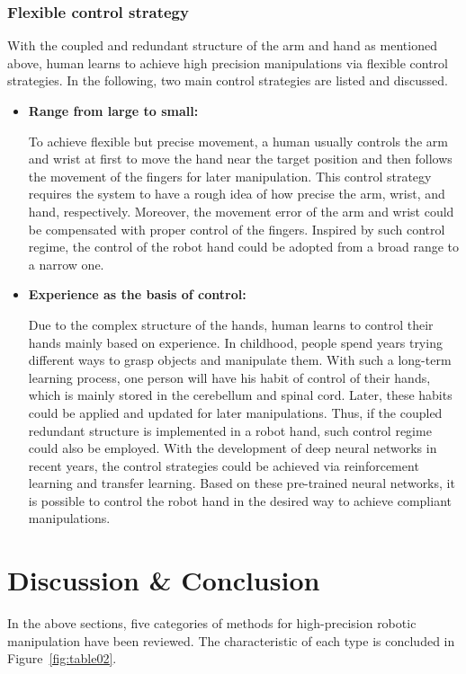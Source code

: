 \documentclass[journal,twoside,web]{ieeecolor}
\begin{document}
\subsubsection{Flexible control strategy} 
With the coupled and redundant structure of the arm and hand as mentioned above, human learns to achieve high precision manipulations via flexible control strategies. In the following, two main control strategies are listed and discussed.
\begin{itemize}
    \item \textbf{Range from large to small:}
    
    To achieve flexible but precise movement, a human usually controls the arm and wrist at first to move the hand near the target position and then follows the movement of the fingers for later manipulation. This control strategy requires the system to have a rough idea of how precise the arm, wrist, and hand, respectively. Moreover, the movement error of the arm and wrist could be compensated with proper control of the fingers. Inspired by such control regime, the control of the robot hand could be adopted from a broad range to a narrow one.
    
    \item \textbf{Experience as the basis of control:}
    
    Due to the complex structure of the hands, human learns to control their hands mainly based on experience. In childhood, people spend years trying different ways to grasp objects and manipulate them. With such a long-term learning process, one person will have his habit of control of their hands, which is mainly stored in the cerebellum and spinal cord. Later, these habits could be applied and updated for later manipulations. Thus, if the coupled redundant structure is implemented in a robot hand, such control regime could also be employed. With the development of deep neural networks in recent years, the control strategies could be achieved via reinforcement learning and transfer learning. Based on these pre-trained neural networks, it is possible to control the robot hand in the desired way to achieve compliant manipulations.	
\end{itemize}

\section{Discussion \& Conclusion}
\label{sec:discuss}

In the above sections, five categories of methods for high-precision robotic manipulation have been reviewed. 
The characteristic of each type is concluded in Figure~\ref{fig:table02}.
\end{document}
